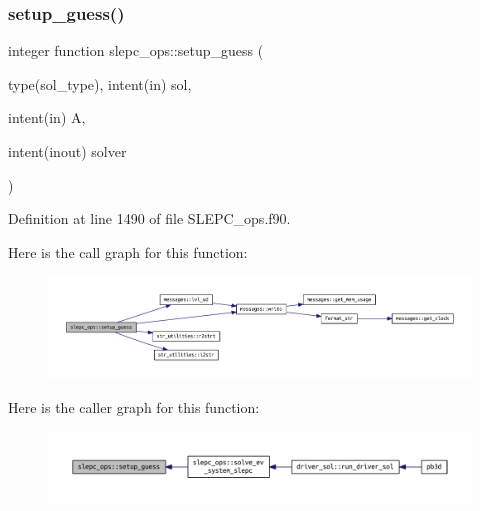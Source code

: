 \subsubsection{\texorpdfstring{setup\+\_\+guess()}{setup\_guess()}}
{\footnotesize\ttfamily integer function slepc\+\_\+ops\+::setup\+\_\+guess (\begin{DoxyParamCaption}\item[{type(sol\+\_\+type), intent(in)}]{sol,  }\item[{intent(in)}]{A,  }\item[{intent(inout)}]{solver }\end{DoxyParamCaption})}



Definition at line 1490 of file S\+L\+E\+P\+C\+\_\+ops.\+f90.

Here is the call graph for this function\+:
\nopagebreak
\begin{figure}[H]
\begin{center}
\leavevmode
\includegraphics[width=350pt]{namespaceslepc__ops_a6f6de293e91e94dc92eb6eab0525a96e_cgraph}
\end{center}
\end{figure}
Here is the caller graph for this function\+:
\nopagebreak
\begin{figure}[H]
\begin{center}
\leavevmode
\includegraphics[width=350pt]{namespaceslepc__ops_a6f6de293e91e94dc92eb6eab0525a96e_icgraph}
\end{center}
\end{figure}
\mbox{\label{namespaceslepc__ops_af8aa2b9b7c5154ebd595afce3f5ebcd0}} 
